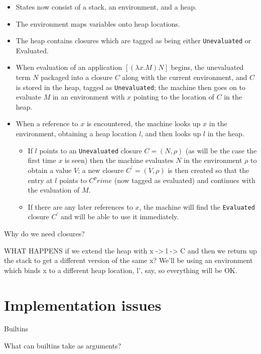 \documentclass[a4paper]{article}
\begin{document}
\begin{itemize}
\item States now consist of a stack, an environment, and a heap.
\item The environment maps variables onto heap locations.
\item The heap contains closures which are tagged as being either
  \texttt{Unevaluated} or {Evaluated}.
\item When evaluation of an application $[(\lambda x.M) N]$ begins,
  the unevaluated term $N$ packaged into a closure $C$ along with the current
  environment, and $C$ is stored in the heap, tagged as 
  \texttt{Unevaluated}; the machine then goes on to evaluate $M$ in an
  environment with $x$ pointing to the location of $C$ in the heap.
\item When a reference to $x$ is encountered, the machine looks up $x$
  in the environment, obtaining a heap location $l$, and then looks up
  $l$ in the heap.  
  \begin{itemize}
    \item If $l$ points to an \texttt{Unevaluated} closure $C = (N,
      \rho)$ (as will be the case the first time $x$ is seen) then the
      machine evaluates $N$ in the environment $\rho$ to obtain a
      value $V$; a new closure $C^\prime = (V, \rho)$ is then
      created so that the entry at $l$ points to
      $C^prime$ (now tagged as evaluated) and continues with the evaluation
      of $M$.
\item If there are any later references to $x$, the machine will find
  the \texttt{Evaluated} closure $C^\prime$ and will be able to use it immediately.

  \end{itemize}
\end{itemize}

Why do we need closures?

WHAT HAPPENS if we extend the heap with x -> l -> C and then we return up
the stack to get a different version of the same x?  We'll be using an
environment which binds x to a different heap location, l', say, so
everything will be OK.

\newpage

\newpage

\section{Implementation issues}

Builtins

What can builtins take as arguments?
\end{document}
